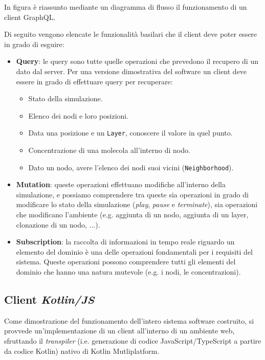 In figura  è riassunto mediante un diagramma di flusso il funzionamento di un client GraphQL.

Di seguito vengono elencate le funzionalità basilari che il client deve poter essere in grado di esguire:
\begin{itemize}
    \item \textbf{Query}: le query sono tutte quelle operazioni che prevedono il recupero di un dato dal server. Per una versione dimostrativa del software
        un client deve essere in grado di effettuare query per recuperare:
        \begin{itemize}
            \item Stato della simulazione.
            \item Elenco dei nodi e loro posizioni.
            \item Data una posizione e un \texttt{Layer}, conoscere il valore in quel punto.
            \item Concentrazione di una molecola all'interno di nodo.
            \item Dato un nodo, avere l'elenco dei nodi suoi vicini (\texttt{Neighborhood}).
        \end{itemize}
    \item \textbf{Mutation}: queste operazioni effettuano modifiche all'interno della simulazione, e possiamo comprendere tra queste sia operazioni
        in grado di modificare lo stato della simulazione (\textit{play}, \textit{pause} e \textit{terminate}), sia operazioni che modificano l'ambiente
        (e.g. aggiunta di un nodo, aggiunta di un layer, clonazione di un nodo, ...).
    \item \textbf{Subscription}: la raccolta di informazioni in tempo reale riguardo un elemento del dominio è una delle operazioni fondamentali per i
        requisiti del sistema. Queste operazioni possono comprendere tutti gli elementi del dominio che hanno una natura mutevole (e.g. i nodi, le concentrazioni).
\end{itemize}

\subsection{Client \textit{Kotlin/JS}}\label{ssec:kt-js-client}
Come dimostrazione del funzionamento dell'intero sistema software costruito, si provvede un'implementazione di un client all'interno di un ambiente
web, sfruttando il \textit{transpiler} (i.e. generazione di codice JavaScript/TypeScript a partire da codice Kotlin) nativo di Kotlin Mutliplatform.
